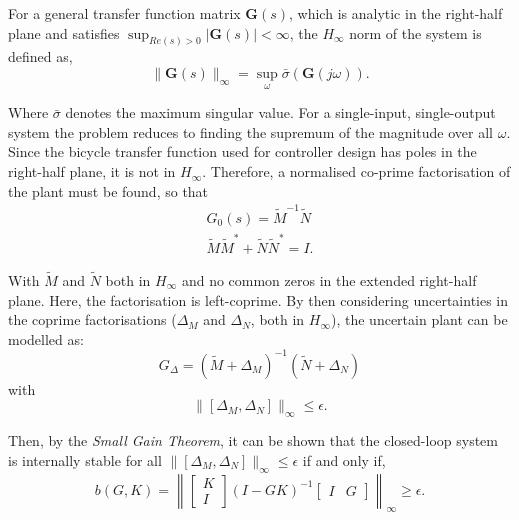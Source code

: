 For a general transfer function matrix $\mathbf{G}(s)$, which is analytic in the right-half plane and satisfies $\sup_{Re(s) > 0}{|\mathbf{G}(s)|}<\infty$, the $H_{\infty}$ norm of the system is defined as,
\begin{equation*}
\lVert \mathbf{G}(s) \rVert_{\infty} = \sup_{\omega}{\bar{\sigma}(\mathbf{G}(j\omega))}.
\end{equation*}

Where $\bar{\sigma}$ denotes the maximum singular value. For a single-input, single-output system the problem reduces to finding the supremum of the magnitude over all $\omega$. \\

Since the bicycle transfer function used for controller design has poles in the right-half plane, it is not in $H_{\infty}$. Therefore, a normalised co-prime factorisation of the plant must be found, so that
\begin{align*}
G_0(s) = \tilde{M}^{-1} \tilde{N} \\
\tilde{M} \tilde{M}^* + \tilde{N} \tilde{N}^* = I.
\end{align*}

With $\tilde{M}$ and $\tilde{N}$ both in $H_{\infty}$ and no common zeros in the extended right-half plane. Here, the factorisation is left-coprime. By then considering uncertainties in the coprime factorisations ($\Delta_M$ and $\Delta_N$, both in $H_{\infty}$), the uncertain plant can be modelled as:
\begin{equation*}
G_{\Delta} = (\tilde{M} + \Delta_M)^{-1} (\tilde{N} + \Delta_N)
\end{equation*}
with
\begin{equation*}
\lVert [\Delta_M, \Delta_N] \rVert_{\infty} \leq \epsilon.
\end{equation*}

\newpage
Then, by the \textit{Small Gain Theorem}, it can be shown that the closed-loop system is internally stable for all $\lVert [\Delta_M, \Delta_N] \rVert_{\infty} \leq \epsilon$ if and only if,
\begin{equation*}
b(G,K) = \left \lVert \begin{bmatrix}
K \\
I
\end{bmatrix} (I - G K)^{-1} \begin{bmatrix}
I & G
\end{bmatrix} \right \rVert_{\infty} \geq \epsilon.
\end{equation*}

